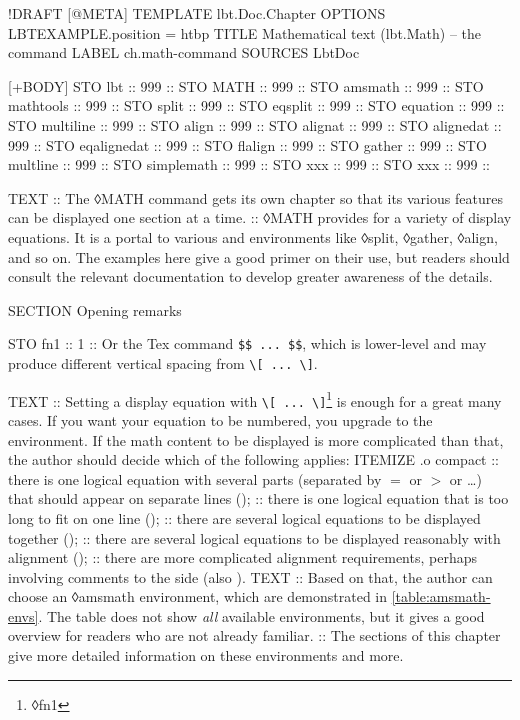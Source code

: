 \begin{lbt}
  !DRAFT
  [@META]
    TEMPLATE lbt.Doc.Chapter
    OPTIONS LBTEXAMPLE.position = htbp
    TITLE Mathematical text \textsf{(lbt.Math)} -- the  command
    LABEL ch.math-command
    SOURCES LbtDoc

  [+BODY]
    STO lbt :: 999 :: \lbtlogo{}
    STO MATH :: 999 :: 
    STO amsmath :: 999 :: 
    STO mathtools :: 999 :: 
    STO split :: 999 :: 
    STO eqsplit :: 999 :: 
    STO equation :: 999 :: 
    STO multiline :: 999 :: 
    STO align :: 999 :: 
    STO alignat :: 999 :: 
    STO alignedat :: 999 :: 
    STO eqalignedat :: 999 :: 
    STO flalign :: 999 :: 
    STO gather :: 999 :: 
    STO multline :: 999 :: 
    STO simplemath :: 999 :: 
    STO xxx :: 999 :: 
    STO xxx :: 999 :: 

    TEXT
    :: The ◊MATH command gets its own chapter so that its various features can be displayed one section at a time.
    :: ◊MATH provides for a variety of display equations. It is a portal to various  and  environments like ◊split, ◊gather, ◊align, and so on. The examples here give a good primer on their use, but readers should consult the relevant documentation to develop greater awareness of the details.

    SECTION Opening remarks

    STO fn1 :: 1 :: Or the Tex command \Verb|$$ ... $$|, which is lower-level and may produce different vertical spacing from \Verb|\[ ... \]|.

    TEXT
    :: Setting a display equation with \Verb|\[ ... \]|\footnote{◊fn1} is enough for a great many cases. If you want your equation to be numbered, you upgrade to the  environment. If the math content to be displayed is more complicated than that, the author should decide which of the following applies:
    ITEMIZE .o compact
    :: there is one logical equation with several parts (separated by $=$ or $>$ or \dots) that should appear on separate lines ();
    :: there is one logical equation that is too long to fit on one line ();
    :: there are several logical equations to be displayed together ();
    :: there are several logical equations to be displayed reasonably with alignment ();
    :: there are more complicated alignment requirements, perhaps involving comments to the side (also ).
    TEXT
    :: Based on that, the author can choose an ◊amsmath environment, which are demonstrated in \cref{table:amsmath-envs}. The table does not show \emph{all} available environments, but it gives a good overview for readers who are not already familiar.
    :: The sections of this chapter give more detailed information on these environments and more.


\end{lbt}
